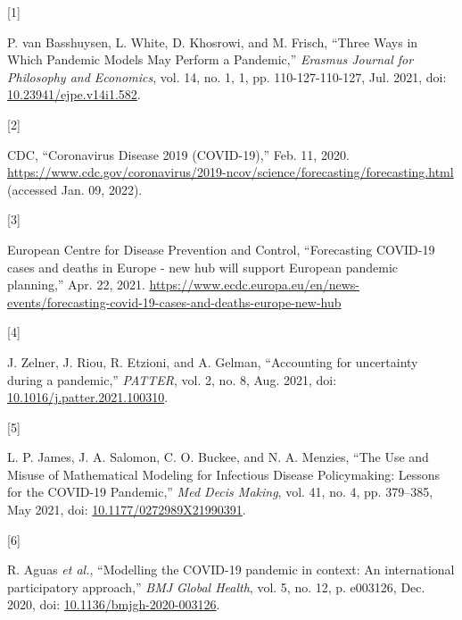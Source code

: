 \documentclass[
]{article}
\newlength{\cslhangindent}
\newlength{\csllabelwidth}
\newlength{\cslentryspacingunit} %
\newenvironment{CSLReferences}[2] %
 {%
  \setlength{\parindent}{0pt}
  \ifodd #1
  \let\oldpar\par
  \def\par{\hangindent=\cslhangindent\oldpar}
  \fi
  \setlength{\parskip}{#2\cslentryspacingunit}
 }%
 {}
\newcommand{\CSLLeftMargin}[1]{\parbox[t]{\csllabelwidth}{#1}}
\newcommand{\CSLRightInline}[1]{\parbox[t]{\linewidth - \csllabelwidth}{#1}\break}
\begin{document}
\hypertarget{refs}{}
\begin{CSLReferences}{0}{0}
\leavevmode{}%
\CSLLeftMargin{{[}1{]} }
\CSLRightInline{P. van Basshuysen, L. White, D. Khosrowi, and M. Frisch, {``Three {Ways} in {Which Pandemic Models May Perform} a {Pandemic},''} \emph{Erasmus Journal for Philosophy and Economics}, vol. 14, no. 1, 1, pp. 110-127-110-127, Jul. 2021, doi: \href{https://doi.org/10.23941/ejpe.v14i1.582}{10.23941/ejpe.v14i1.582}.}

\leavevmode{}%
\CSLLeftMargin{{[}2{]} }
\CSLRightInline{CDC, {``Coronavirus {Disease} 2019 ({COVID-19}),''} Feb. 11, 2020. \url{https://www.cdc.gov/coronavirus/2019-ncov/science/forecasting/forecasting.html} (accessed Jan. 09, 2022).}

\leavevmode{}%
\CSLLeftMargin{{[}3{]} }
\CSLRightInline{European Centre for Disease Prevention and Control, {``Forecasting {COVID-19} cases and deaths in {Europe} - new hub will support {European} pandemic planning,''} Apr. 22, 2021. \url{https://www.ecdc.europa.eu/en/news-events/forecasting-covid-19-cases-and-deaths-europe-new-hub}}

\leavevmode{}%
\CSLLeftMargin{{[}4{]} }
\CSLRightInline{J. Zelner, J. Riou, R. Etzioni, and A. Gelman, {``Accounting for uncertainty during a pandemic,''} \emph{PATTER}, vol. 2, no. 8, Aug. 2021, doi: \href{https://doi.org/10.1016/j.patter.2021.100310}{10.1016/j.patter.2021.100310}.}

\leavevmode{}%
\CSLLeftMargin{{[}5{]} }
\CSLRightInline{L. P. James, J. A. Salomon, C. O. Buckee, and N. A. Menzies, {``The {Use} and {Misuse} of {Mathematical Modeling} for {Infectious Disease Policymaking}: {Lessons} for the {COVID-19 Pandemic},''} \emph{Med Decis Making}, vol. 41, no. 4, pp. 379--385, May 2021, doi: \href{https://doi.org/10.1177/0272989X21990391}{10.1177/0272989X21990391}.}

\leavevmode{}%
\CSLLeftMargin{{[}6{]} }
\CSLRightInline{R. Aguas \emph{et al.}, {``Modelling the {COVID-19} pandemic in context: An international participatory approach,''} \emph{BMJ Global Health}, vol. 5, no. 12, p. e003126, Dec. 2020, doi: \href{https://doi.org/10.1136/bmjgh-2020-003126}{10.1136/bmjgh-2020-003126}.}


\end{CSLReferences}
\end{document}
